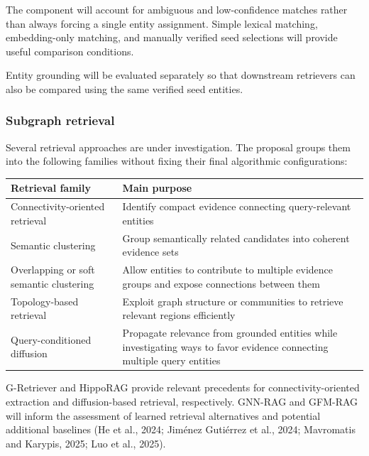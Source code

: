 The component will account for ambiguous and low-confidence matches rather than always forcing a single entity assignment. Simple lexical matching, embedding-only matching, and manually verified seed selections will provide useful comparison conditions.

Entity grounding will be evaluated separately so that downstream retrievers can also be compared using the same verified seed entities.

\subsubsection{Subgraph retrieval}\label{subgraph-retrieval}

Several retrieval approaches are under investigation. The proposal groups them into the following families without fixing their final algorithmic configurations:

{
\begin{longtable}[]{@{}
  >{\raggedright\arraybackslash}p{}
  >{\raggedright\arraybackslash}p{}@{}}
\toprule\noalign{}
\begin{minipage}[b]{\linewidth}\raggedright
Retrieval family
\end{minipage} & \begin{minipage}[b]{\linewidth}\raggedright
Main purpose
\end{minipage} \\
\midrule\noalign{}
\endhead
\bottomrule\noalign{}
\endlastfoot
Connectivity-oriented retrieval & Identify compact evidence connecting query-relevant entities \\
Semantic clustering & Group semantically related candidates into coherent evidence sets \\
Overlapping or soft semantic clustering & Allow entities to contribute to multiple evidence groups and expose connections between them \\
Topology-based retrieval & Exploit graph structure or communities to retrieve relevant regions efficiently \\
Query-conditioned diffusion & Propagate relevance from grounded entities while investigating ways to favor evidence connecting multiple query entities \\
\end{longtable}
}

G-Retriever and HippoRAG provide relevant precedents for connectivity-oriented extraction and diffusion-based retrieval, respectively. GNN-RAG and GFM-RAG will inform the assessment of learned retrieval alternatives and potential additional baselines (He et al., 2024; Jiménez Gutiérrez et al., 2024; Mavromatis and Karypis, 2025; Luo et al., 2025).

